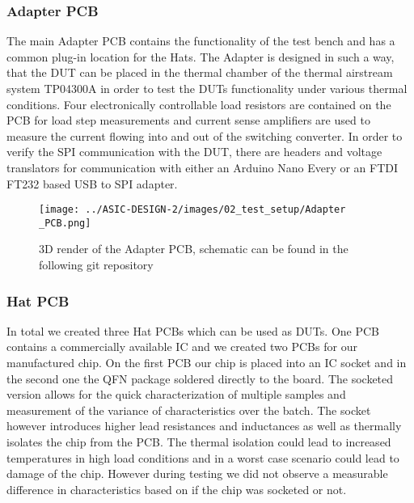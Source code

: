 \clearpage

\subsubsection{Adapter PCB}
The main Adapter \ac{PCB} contains the functionality of the test bench and has a common plug-in location for the Hats. The Adapter is designed in such a way, that the \ac{DUT} can be placed in the thermal chamber of the thermal airstream system TP04300A in order to test the \ac{DUT}s functionality under various thermal conditions. Four electronically controllable load resistors are contained on the \ac{PCB} for load step measurements and current sense amplifiers are used to measure the current flowing into and out of the switching converter. In order to verify the SPI communication with the \ac{DUT}, there are headers and voltage translators for communication with either an Arduino Nano Every or an FTDI FT232 based USB to SPI adapter.

\begin{figure}[h]
    \centering
    \texttt{[image: ../ASIC-DESIGN-2/images/02\_test\_setup/Adapter \_PCB.png]}
    \caption{3D render of the Adapter PCB, schematic can be found in the following git repository \cite{PCB_schematic}}
    \label{fig:Adapter_PCB}
\end{figure}

\clearpage

\subsubsection{Hat PCB}
In total we created three Hat \ac{PCB}s which can be used as \ac{DUT}s. One \ac{PCB} contains a commercially available \ac{IC} and we created two \ac{PCB}s for our manufactured chip. On the first \ac{PCB} our chip is placed into an \ac{IC} socket and in the second one the QFN package soldered directly to the board. The socketed version allows for the quick characterization of multiple samples and measurement of the variance of characteristics over the batch. The socket however introduces higher lead resistances and inductances as well as thermally isolates the chip from the \ac{PCB}. The thermal isolation could lead to increased temperatures in high load conditions and in a worst case scenario could lead to damage of the chip. However during testing we did not observe a measurable difference in characteristics based on if the chip was socketed or not.\\


